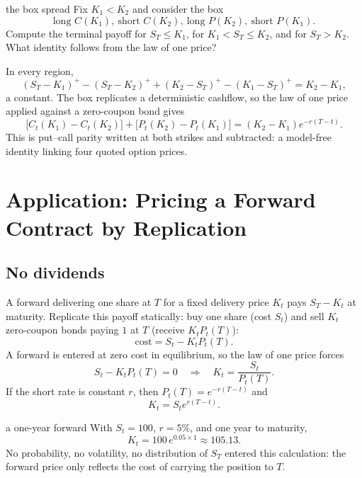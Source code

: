\documentclass[10pt]{article}
\newcommand{\1}{\mathbf 1}
\theoremstyle{definition}
\begin{document}
\begin{studentexercise}{the box spread}
Fix \(K_1<K_2\) and consider the box
\[
\text{long }C(K_1),\ \text{short }C(K_2),\ \text{long }P(K_2),\ \text{short }P(K_1).
\]
Compute the terminal payoff for \(S_T\leq K_1\), for \(K_1<S_T\leq K_2\), and
for \(S_T>K_2\). What identity follows from the law of one price?
\end{studentexercise}
\begin{shortsolution}
In every region,
\[
(S_T-K_1)^+-(S_T-K_2)^++(K_2-S_T)^+-(K_1-S_T)^+=K_2-K_1,
\]
a constant. The box replicates a deterministic cashflow, so the law of one
price applied against a zero-coupon bond gives
\[
\boxed{
\bigl[C_t(K_1)-C_t(K_2)\bigr]+\bigl[P_t(K_2)-P_t(K_1)\bigr]
=(K_2-K_1)e^{-r(T-t)}.}
\]
This is put--call parity written at both strikes and subtracted: a
model-free identity linking four quoted option prices.
\end{shortsolution}

\section{Application: Pricing a Forward Contract by Replication}

\subsection{No dividends}

A forward delivering one share at \(T\) for a fixed delivery price \(K_t\)
pays \(S_T-K_t\) at maturity. Replicate this payoff statically: buy one share
(cost \(S_t\)) and sell \(K_t\) zero-coupon bonds paying \(1\) at \(T\)
(receive \(K_tP_t(T)\)):
\[
\text{cost}=S_t-K_tP_t(T).
\]
A forward is entered at zero cost in equilibrium, so the law of one price
forces
\[
S_t-K_tP_t(T)=0
\quad\Longrightarrow\quad
\boxed{K_t=\frac{S_t}{P_t(T)}.}
\]
If the short rate is constant \(r\), then \(P_t(T)=e^{-r(T-t)}\) and
\[
\boxed{K_t=S_te^{r(T-t)}.}
\]

\begin{boardexample}{a one-year forward}
With \(S_t=100\), \(r=5\%\), and one year to maturity,
\[
K_t=100\,e^{0.05\times1}\approx\boxed{105.13.}
\]
No probability, no volatility, no distribution of \(S_T\) entered this
calculation: the forward price only reflects the cost of carrying the
position to \(T\).
\end{boardexample}
\end{document}
